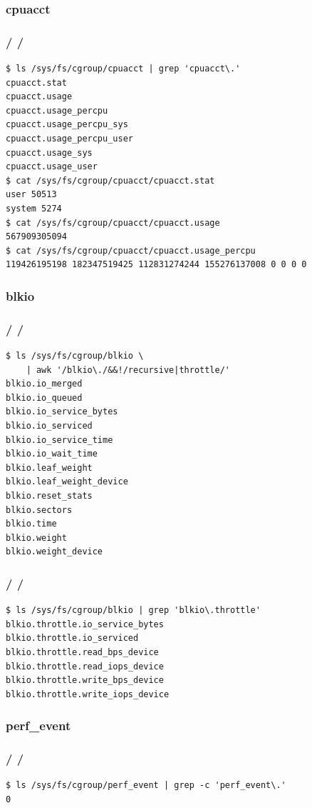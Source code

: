 \documentclass{beamer}
\newcommand{\autotitle}
{\frametitle{
    \secname
    \ifx\insertsubsection\empty
    \else
        /\subsecname
        \ifx\insertsubsubsection\empty\else/\subsubsecname\fi
    \fi}}
\begin{document}
\subsubsection{cpuacct}

\begin{frame}[fragile]
    \autotitle
    \begin{verbatim}
$ ls /sys/fs/cgroup/cpuacct | grep 'cpuacct\.'
cpuacct.stat
cpuacct.usage
cpuacct.usage_percpu
cpuacct.usage_percpu_sys
cpuacct.usage_percpu_user
cpuacct.usage_sys
cpuacct.usage_user
$ cat /sys/fs/cgroup/cpuacct/cpuacct.stat
user 50513
system 5274
$ cat /sys/fs/cgroup/cpuacct/cpuacct.usage
567909305094
$ cat /sys/fs/cgroup/cpuacct/cpuacct.usage_percpu
119426195198 182347519425 112831274244 155276137008 0 0 0 0 
    \end{verbatim}
\end{frame}

\subsubsection{blkio}

\begin{frame}[fragile]
    \autotitle
    \begin{verbatim}
$ ls /sys/fs/cgroup/blkio \
    | awk '/blkio\./&&!/recursive|throttle/'
blkio.io_merged
blkio.io_queued
blkio.io_service_bytes
blkio.io_serviced
blkio.io_service_time
blkio.io_wait_time
blkio.leaf_weight
blkio.leaf_weight_device
blkio.reset_stats
blkio.sectors
blkio.time
blkio.weight
blkio.weight_device
    \end{verbatim}
\end{frame}

\begin{frame}[fragile]
    \autotitle
    \begin{verbatim}
$ ls /sys/fs/cgroup/blkio | grep 'blkio\.throttle'
blkio.throttle.io_service_bytes
blkio.throttle.io_serviced
blkio.throttle.read_bps_device
blkio.throttle.read_iops_device
blkio.throttle.write_bps_device
blkio.throttle.write_iops_device
    \end{verbatim}
\end{frame}

\subsubsection{perf\_event}

\begin{frame}[fragile]
    \autotitle
    \begin{verbatim}
$ ls /sys/fs/cgroup/perf_event | grep -c 'perf_event\.'
0
    \end{verbatim}
\end{frame}
\end{document}
